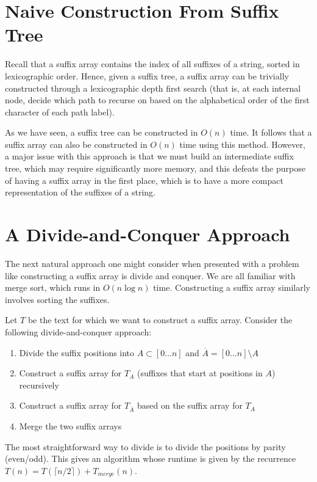 \section{Naive Construction From Suffix Tree}

Recall that a suffix array contains the index of all suffixes of a string, sorted in lexicographic order. Hence, given a suffix tree, a suffix array can be trivially constructed through a lexicographic depth first search (that is, at each internal node, decide which path to recurse on based on the alphabetical order of the first character of each path label).

As we have seen, a suffix tree can be constructed in $O(n)$ time. It follows that a suffix array can also be constructed in $O(n)$ time using this method. However, a major issue with this approach is that we must build an intermediate suffix tree, which may require significantly more memory, and this defeats the purpose of having a suffix array in the first place, which is to have a more compact representation of the suffixes of a string.

\section{A Divide-and-Conquer Approach}

The next natural approach one might consider when presented with a problem like constructing a suffix array is divide and conquer. We are all familiar with merge sort, which runs in $O(n \log n)$ time. Constructing a suffix array similarly involves sorting the suffixes.

Let $T$ be the text for which we want to construct a suffix array. Consider the following divide-and-conquer approach:

\begin{enumerate}
    \item Divide the suffix positions into $A \subset [0\ldots n]$ and $\overline{A} = [0\ldots n] \setminus A$
    \item Construct a suffix array for $T_A$ (suffixes that start at positions in $A$) recursively
    \item Construct a suffix array for $T_{\overline{A}}$ based on the suffix array for $T_A$
    \item Merge the two suffix arrays
\end{enumerate}

The most straightforward way to divide is to divide the positions by parity (even/odd). This gives an algorithm whose runtime is given by the recurrence $T(n) = T(\lceil n/2 \rceil) + T_{merge}(n)$.

